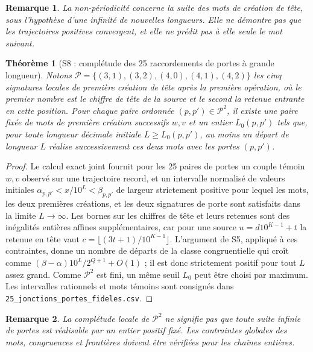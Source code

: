 \documentclass[11pt,a4paper]{article}
\newtheorem{theorem}{Théorème}
\newtheorem{remark}{Remarque}
\begin{document}
\begin{remark}La non-périodicité concerne la suite des \emph{mots de création de tête}, sous l'hypothèse d'une infinité de nouvelles longueurs. Elle ne démontre pas que les trajectoires positives convergent, et elle ne prédit pas à elle seule le mot suivant.\end{remark}


\begin{theorem}[S8 : complétude des 25 raccordements de portes à grande longueur]
Notons $\mathcal P=\{(3,1),(3,2),(4,0),(4,1),(4,2)\}$ les cinq signatures locales de première création de tête après la première opération, où le premier nombre est le chiffre de tête de la source et le second la retenue entrante en cette position. Pour chaque paire ordonnée $(p,p')\in\mathcal P^2$, il existe une paire fixée de mots de première création successifs $w,v$ et un entier $L_0(p,p')$ tels que, pour toute longueur décimale initiale $L\ge L_0(p,p')$, au moins un départ de longueur $L$ réalise successivement ces deux mots avec les portes $(p,p')$. 
\end{theorem}
\begin{proof}Le calcul exact joint fournit pour les 25 paires de portes un couple témoin $w,v$ observé sur une trajectoire record, et un intervalle normalisé de valeurs initiales $\alpha_{p,p'}<x/10^L<\beta_{p,p'}$ de largeur strictement positive pour lequel les mots, les deux premières créations, et les deux signatures de porte sont satisfaits dans la limite $L\to\infty$. Les bornes sur les chiffres de tête et leurs retenues sont des inégalités entières affines supplémentaires, car pour une source $u=d10^{K-1}+t$ la retenue en tête vaut $c=\lfloor(3t+1)/10^{K-1}\rfloor$. L'argument de S5, appliqué à ces contraintes, donne un nombre de départs de la classe congruentielle qui croît comme $(\beta-\alpha)10^L/2^{Q+1}+O(1)$ ; il est donc strictement positif pour tout $L$ assez grand. Comme $\mathcal P^2$ est fini, un même seuil $L_0$ peut être choisi par maximum. Les intervalles rationnels et mots témoins sont consignés dans \texttt{25\_jonctions\_portes\_fideles.csv}.\end{proof}
\begin{remark}La complétude locale de $\mathcal P^2$ ne signifie pas que toute suite infinie de portes est réalisable par un entier positif fixé. Les contraintes globales des mots, congruences et frontières doivent être vérifiées pour les chaînes entières.\end{remark}
\end{document}
